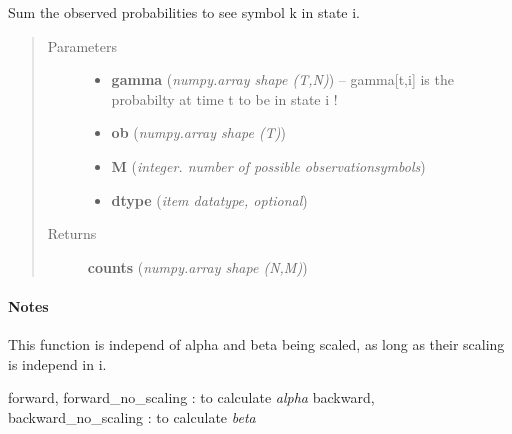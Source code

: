\documentclass[letterpaper,10pt,english]{sphinxmanual}
\begin{document}
\begin{fulllineitems}
\label{hmm:kernel.python.symbol_counts}
Sum the observed probabilities to see symbol k in state i.
\begin{quote}\begin{description}
\item[{Parameters}] \leavevmode\begin{itemize}
\item {} 
\textbf{gamma} (\emph{numpy.array shape (T,N)}) --
gamma{[}t,i{]} is the probabilty at time t to be in state i !

\item {} 
\textbf{ob} (\emph{numpy.array shape (T)})

\item {} 
\textbf{M} (\emph{integer. number of possible observationsymbols})

\item {} 
\textbf{dtype} (\emph{item datatype, optional})

\end{itemize}

\item[{Returns}] \leavevmode
\textbf{counts} (\emph{numpy.array shape (N,M)})

\end{description}\end{quote}
\paragraph{Notes}

This function is independ of alpha and beta being scaled, as long as their
scaling is independ in i.




forward, forward\_no\_scaling : to calculate \emph{alpha}
backward, backward\_no\_scaling : to calculate \emph{beta}



\end{fulllineitems}

\end{document}
